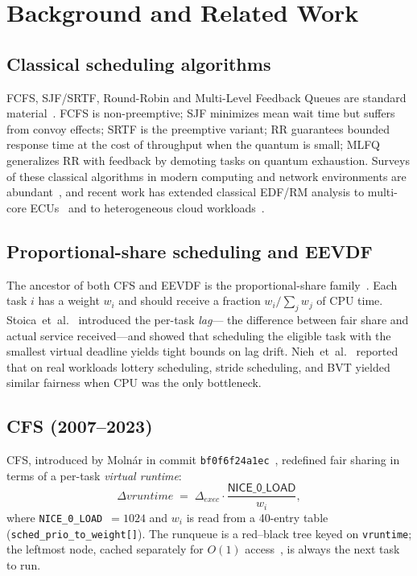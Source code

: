 \documentclass[conference]{IEEEtran}
\begin{document}
\section{Background and Related Work}
\label{sec:background}

\subsection{Classical scheduling algorithms}

FCFS, SJF/SRTF, Round-Robin and Multi-Level Feedback Queues are
standard material~\cite{silberschatz2018,tanenbaum2014}. FCFS is
non-preemptive; SJF minimizes mean wait time but suffers from convoy
effects; SRTF is the preemptive variant; RR guarantees bounded
response time at the cost of throughput when the quantum is small;
MLFQ generalizes RR with feedback by demoting tasks on quantum
exhaustion. Surveys of these classical algorithms in modern computing
and network environments are
abundant~\cite{comst_scheduling_survey_2023}, and recent work has
extended classical EDF/RM analysis to multi-core
ECUs~\cite{rastogi2023edfrm} and to heterogeneous cloud
workloads~\cite{tpds_dist_rl_2023}.

\subsection{Proportional-share scheduling and EEVDF}

The ancestor of both CFS and EEVDF is the proportional-share
family~\cite{waldspurger1994}. Each task $i$ has a weight $w_i$ and
should receive a fraction $w_i/\sum_j w_j$ of CPU time.
Stoica~et~al.~\cite{stoica1995} introduced the per-task \emph{lag}---
the difference between fair share and actual service received---and
showed that scheduling the eligible task with the smallest virtual
deadline yields tight bounds on lag drift.
Nieh~et~al.~\cite{nieh2003} reported that on real workloads lottery
scheduling, stride scheduling, and BVT yielded similar fairness when
CPU was the only bottleneck.

\subsection{CFS (2007--2023)}

CFS, introduced by Moln\'ar in commit
\texttt{bf0f6f24a1ec}~\cite{molnar_cfs_2007}, redefined fair sharing
in terms of a per-task \emph{virtual runtime}:
\begin{equation}
\Delta\mathit{vruntime} \;=\; \Delta_{\mathit{exec}} \cdot
                              \frac{\textsf{NICE\_0\_LOAD}}{w_i},
\label{eq:vruntime}
\end{equation}
where \texttt{NICE\_0\_LOAD}~$=1024$ and $w_i$ is read from a 40-entry
table (\texttt{sched\_prio\_to\_weight[]}). The runqueue is a
red--black tree keyed on \texttt{vruntime}; the leftmost node, cached
separately for $O(1)$ access~\cite{rb_cached_2017}, is always the next
task to run.
\end{document}
